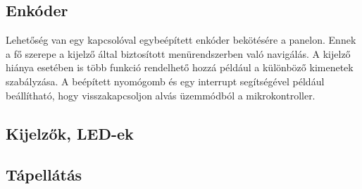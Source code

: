\subsection{Enkóder}
Lehetőség van egy kapcsolóval egybeépített enkóder bekötésére a panelon. Ennek a fő szerepe a kijelző által biztosított menürendszerben való navigálás. A kijelző hiánya esetében is több funkció rendelhető hozzá például a különböző kimenetek szabályzása. A beépített nyomógomb és egy interrupt segítségével például beállítható, hogy visszakapcsoljon alvás üzemmódból a mikrokontroller.

\subsection{Kijelzők, LED-ek}
\subsection{Tápellátás}